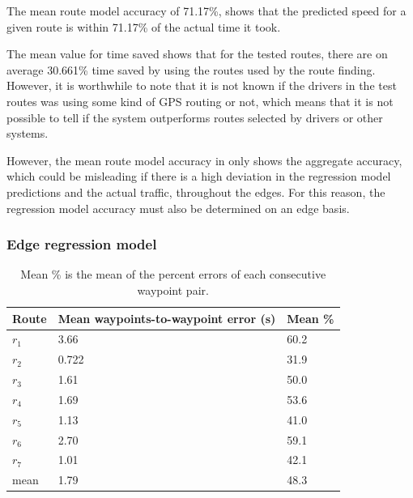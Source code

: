 The mean route model accuracy of 71.17\%, shows that the predicted speed for a given route is within 71.17\% of the actual time it took. 

The mean value for time saved shows that for the tested routes, there are on average 30.661\% time saved by using the routes used by the route finding. However, it is worthwhile to note that it is not known if the drivers in the test routes was using some kind of GPS routing or not, which means that it is not possible to tell if the system outperforms routes selected by drivers or other systems.

However, the mean route model accuracy in  only shows the aggregate accuracy, which could be misleading if there is a high deviation in the regression model predictions and the actual traffic, throughout the edges. For this reason, the regression model accuracy must also be determined on an edge basis.

\subsubsection{Edge regression model}

\begin{table}[H]
	\centering
	\begin{tabular}{lll}
		\textbf{Route} & \textbf{Mean waypoints-to-waypoint error (s)}    & \textbf{Mean \%} \\ \hline
		$r_1$          & 3.66                                             & 60.2 \\
		$r_2$          & 0.722                                            & 31.9 \\
		$r_3$          & 1.61                                             & 50.0 \\
		$r_4$          & 1.69                                             & 53.6 \\
		$r_5$          & 1.13                                             & 41.0 \\
		$r_6$          & 2.70                                             & 59.1 \\
		$r_7$          & 1.01                                             & 42.1 \\ \hline
		mean           & 1.79                                             & 48.3
	\end{tabular}
	\caption{Mean \% is the mean of the percent errors of each consecutive waypoint pair.}
	\label{tab:eval-results-2}
\end{table}